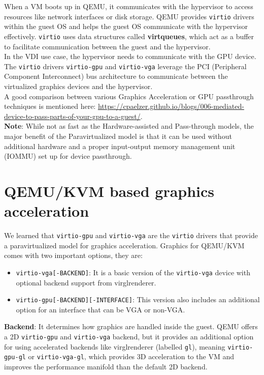 \documentclass[a4paper,12pt, final]{report}
\begin{document}
\noindent When a VM boots up in QEMU, it communicates with the hypervisor to access resources like network interfaces or disk storage. QEMU provides \verb|virtio| drivers within the guest OS and helps the guest OS communicate with the hypervisor effectively. \verb|virtio| uses data structures called \textbf{virtqueues}, which act as a buffer to facilitate communication between the guest and the hypervisor.\\

\noindent In the VDI use case, the hypervisor needs to communicate with the GPU device. The \verb|virtio| drivers \verb|virtio-gpu| and \verb|virtio-vga| leverage the PCI (Peripheral Component Interconnect) bus architecture to communicate between the virtualized graphics devices and the hypervisor.\\

\noindent A good comparison between various Graphics Acceleration or GPU passthrough techniques is mentioned here: \url{https://cpaelzer.github.io/blogs/006-mediated-device-to-pass-parts-of-your-gpu-to-a-guest/}.\\

\noindent \textbf{Note}: While not as fast as the Hardware-assisted and Pass-through models, the major benefit of the Paravirtualized model is that it can be used without additional hardware and a proper input-output memory management unit (IOMMU) set up for device passthrough.

\section{QEMU/KVM based graphics acceleration}
We learned that \verb|virtio-gpu| and \verb|virtio-vga| are the \verb|virtio| drivers that provide a paravirtualized model for graphics acceleration. Graphics for QEMU/KVM comes with two important options, they are:

\begin{itemize}
    \item \verb|virtio-vga[-BACKEND]|: It is a basic version of the \verb|virtio-vga| device with optional backend support from virglrenderer.
    \item \verb|virtio-gpu[-BACKEND][-INTERFACE]|: This version also includes an additional option for an interface that can be VGA or non-VGA.
\end{itemize}

\noindent \textbf{Backend}: It determines how graphics are handled inside the guest. QEMU offers a 2D \verb|virtio-gpu| and \verb|virtio-vga| backend, but it provides an additional option for using accelerated backends like virglrenderer (labelled \verb|gl|), meaning \verb|virtio-gpu-gl| or \verb|virtio-vga-gl|, which provides 3D acceleration to the VM and improves the performance manifold than the default 2D backend.\\
\end{document}
